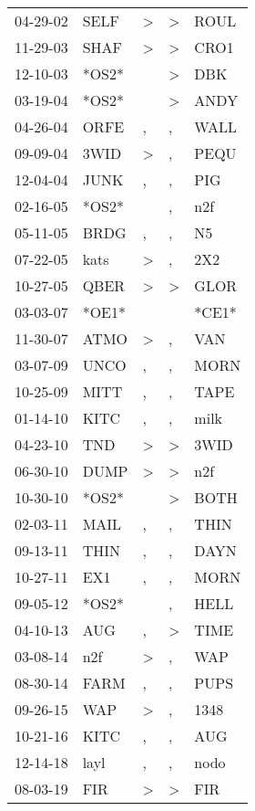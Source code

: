 \begin{supertabular}{lllll}
 04-29-02 &   SELF &  \textgreater &  \textgreater &   ROUL \\
 11-29-03 &   SHAF &  \textgreater &  \textgreater &   CRO1 \\
 12-10-03 &  *OS2* &               &  \textgreater &    DBK \\
 03-19-04 &  *OS2* &               &  \textgreater &   ANDY \\
 04-26-04 &   ORFE &             , &             , &   WALL \\
 09-09-04 &   3WID &  \textgreater &             , &   PEQU \\
 12-04-04 &   JUNK &             , &             , &    PIG \\
 02-16-05 &  *OS2* &               &             , &    n2f \\
 05-11-05 &   BRDG &             , &             , &     N5 \\
 07-22-05 &   kats &  \textgreater &             , &    2X2 \\
 10-27-05 &   QBER &  \textgreater &  \textgreater &   GLOR \\
 03-03-07 &  *OE1* &               &               &  *CE1* \\
 11-30-07 &   ATMO &  \textgreater &             , &    VAN \\
 03-07-09 &   UNCO &             , &             , &   MORN \\
 10-25-09 &   MITT &             , &             , &   TAPE \\
 01-14-10 &   KITC &             , &             , &   milk \\
 04-23-10 &    TND &  \textgreater &  \textgreater &   3WID \\
 06-30-10 &   DUMP &  \textgreater &  \textgreater &    n2f \\
 10-30-10 &  *OS2* &               &  \textgreater &   BOTH \\
 02-03-11 &   MAIL &             , &             , &   THIN \\
 09-13-11 &   THIN &             , &             , &   DAYN \\
 10-27-11 &    EX1 &             , &             , &   MORN \\
 09-05-12 &  *OS2* &               &             , &   HELL \\
 04-10-13 &    AUG &             , &  \textgreater &   TIME \\
 03-08-14 &    n2f &  \textgreater &             , &    WAP \\
 08-30-14 &   FARM &             , &             , &   PUPS \\
 09-26-15 &    WAP &  \textgreater &             , &   1348 \\
 10-21-16 &   KITC &             , &             , &    AUG \\
 12-14-18 &   layl &             , &             , &   nodo \\
 08-03-19 &    FIR &  \textgreater &  \textgreater &    FIR \\
\end{supertabular}
